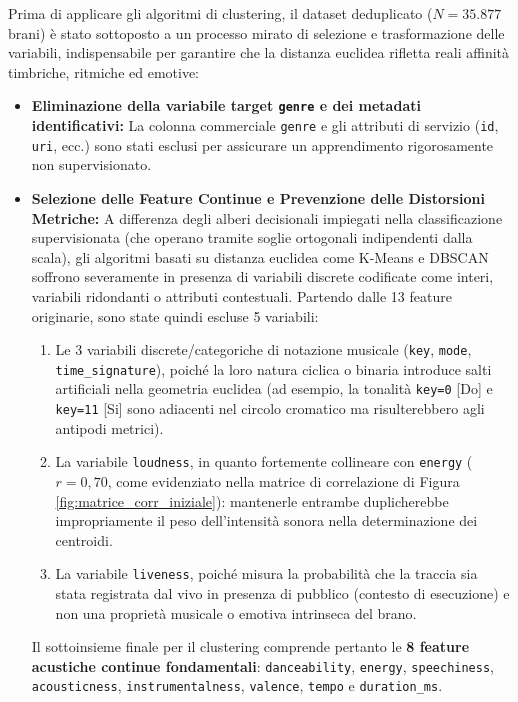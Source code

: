 \documentclass[12pt,a4paper]{article}
\begin{document}
Prima di applicare gli algoritmi di clustering, il dataset deduplicato ($N = 35.877$ brani) è stato sottoposto a un processo mirato di selezione e trasformazione delle variabili, indispensabile per garantire che la distanza euclidea rifletta reali affinità timbriche, ritmiche ed emotive:
\begin{itemize}
    \item \textbf{Eliminazione della variabile target \texttt{genre} e dei metadati identificativi:} La colonna commerciale \texttt{genre} e gli attributi di servizio (\texttt{id}, \texttt{uri}, ecc.) sono stati esclusi per assicurare un apprendimento rigorosamente non supervisionato.
    \item \textbf{Selezione delle Feature Continue e Prevenzione delle Distorsioni Metriche:} A differenza degli alberi decisionali impiegati nella classificazione supervisionata (che operano tramite soglie ortogonali indipendenti dalla scala), gli algoritmi basati su distanza euclidea come K-Means e DBSCAN soffrono severamente in presenza di variabili discrete codificate come interi, variabili ridondanti o attributi contestuali. Partendo dalle 13 feature originarie, sono state quindi escluse 5 variabili:
    \begin{enumerate}
        \item Le 3 variabili discrete/categoriche di notazione musicale (\texttt{key}, \texttt{mode}, \texttt{time\_signature}), poiché la loro natura ciclica o binaria introduce salti artificiali nella geometria euclidea (ad esempio, la tonalità \texttt{key=0} [Do] e \texttt{key=11} [Si] sono adiacenti nel circolo cromatico ma risulterebbero agli antipodi metrici).
        \item La variabile \texttt{loudness}, in quanto fortemente collineare con \texttt{energy} ($r = 0,70$, come evidenziato nella matrice di correlazione di Figura \ref{fig:matrice_corr_iniziale}): mantenerle entrambe duplicherebbe impropriamente il peso dell'intensità sonora nella determinazione dei centroidi.
        \item La variabile \texttt{liveness}, poiché misura la probabilità che la traccia sia stata registrata dal vivo in presenza di pubblico (contesto di esecuzione) e non una proprietà musicale o emotiva intrinseca del brano.
    \end{enumerate}
    Il sottoinsieme finale per il clustering comprende pertanto le \textbf{8 feature acustiche continue fondamentali}: \texttt{danceability}, \texttt{energy}, \texttt{speechiness}, \texttt{acousticness}, \texttt{instrumentalness}, \texttt{valence}, \texttt{tempo} e \texttt{duration\_ms}.

\end{itemize}
\end{document}
